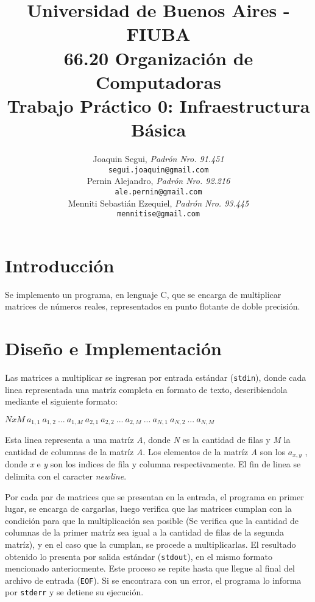 \documentclass[10pt,a4paper]{article}
\title{Universidad de Buenos Aires - FIUBA \\
		66.20 Organización de Computadoras \\
		Trabajo Práctico 0: Infraestructura Básica\\}
\author{	Joaquin Segui, \textit{Padrón Nro. 91.451}                     \\
            \texttt{ segui.joaquin@gmail.com }                                          \\[2.5ex]
            Pernin Alejandro, \textit{Padrón Nro. 92.216}                     \\
            \texttt{ale.pernin@gmail.com}                                              \\[2.5ex]
            Menniti Sebastián Ezequiel, \textit{Padrón Nro. 93.445}                     \\
            \texttt{ mennitise@gmail.com }                                              \\[2.5ex]}
\date{}
\begin{document}
%


\maketitle\thispagestyle{empty}

\newpage\null\thispagestyle{empty}\newpage



\section{Introducción}

Se implemento un programa, en lenguaje C, que se encarga de multiplicar matrices de números reales, representados en punto flotante de doble precisión.


\section{Diseño e Implementación}

Las matrices a multiplicar se ingresan por entrada estándar (\texttt{stdin}), donde cada linea representada una matríz completa en formato de texto, describiendola mediante el siguiente formato:

\begin{center}

$NxM \: a_{1,1} \: a_{1,2} \: ... \: a_{1,M} \: a_{2,1} \: a_{2,2} \: ... \: a_{2,M} \: ... \: a_{N,1} \: a_{N,2} \: ... \: a_{N,M}$

\end{center}
Esta linea representa a una matríz \textit{A}, donde \textit{N} es la cantidad de filas y \textit{M} la cantidad de columnas de la matríz \textit{A}. Los elementos de la matríz \textit{A} son los \textit{$a_{x,y}$} , donde \textit{x} e \textit{y} son los indices de fila y columna respectivamente. El fin de linea se delimita con el caracter \textit{newline}.

Por cada par de matrices que se presentan en la entrada, el programa en primer lugar, se encarga de cargarlas, luego verifica que las matrices cumplan con la condición para que la multiplicación sea posible (Se verifica que la cantidad de columnas de la primer matríz sea igual a la cantidad de filas de la segunda matríz), y en el caso que la cumplan, se procede a multiplicarlas. El resultado obtenido lo presenta por salida estándar (\texttt{stdout}), en el mismo formato mencionado anteriormente. Este proceso se repite hasta que llegue al final del archivo de entrada (\texttt{EOF}). Si se encontrara con un error, el programa lo informa por \texttt{stderr} y se detiene su ejecución.
\end{document}
